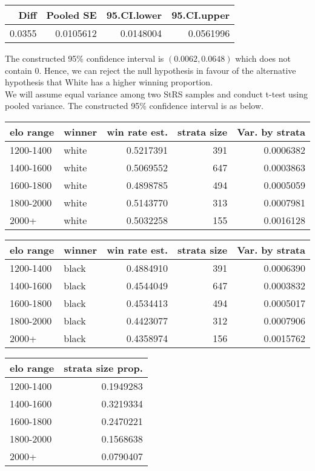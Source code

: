 \documentclass[11pt,]{article}
\begin{document}
\begin{tabular}{r|r|r|r}
\hline
Diff & Pooled SE & 95.CI.lower & 95.CI.upper\\
\hline
0.0355 & 0.0105612 & 0.0148004 & 0.0561996\\
\hline
\end{tabular}

The constructed 95\% confidence interval is \((0.0062, 0.0648)\) which
does not contain 0. Hence, we can reject the null hypothesis in favour
of the alternative hypothesis that White has a higher winning
proportion.\\
\newline We will assume equal variance among two StRS samples and
conduct t-test using pooled variance. The constructed 95\% confidence
interval is as below.

\begin{tabular}{l|l|r|r|r}
\hline
elo range & winner & win rate est. & strata size & Var. by strata\\
\hline
1200-1400 & white & 0.5217391 & 391 & 0.0006382\\
\hline
1400-1600 & white & 0.5069552 & 647 & 0.0003863\\
\hline
1600-1800 & white & 0.4898785 & 494 & 0.0005059\\
\hline
1800-2000 & white & 0.5143770 & 313 & 0.0007981\\
\hline
2000+ & white & 0.5032258 & 155 & 0.0016128\\
\hline
\end{tabular}

\begin{tabular}{l|l|r|r|r}
\hline
elo range & winner & win rate est. & strata size & Var. by strata\\
\hline
1200-1400 & black & 0.4884910 & 391 & 0.0006390\\
\hline
1400-1600 & black & 0.4544049 & 647 & 0.0003832\\
\hline
1600-1800 & black & 0.4534413 & 494 & 0.0005017\\
\hline
1800-2000 & black & 0.4423077 & 312 & 0.0007906\\
\hline
2000+ & black & 0.4358974 & 156 & 0.0015762\\
\hline
\end{tabular}

\begin{tabular}{l|r}
\hline
elo range & strata size prop.\\
\hline
1200-1400 & 0.1949283\\
\hline
1400-1600 & 0.3219334\\
\hline
1600-1800 & 0.2470221\\
\hline
1800-2000 & 0.1568638\\
\hline
2000+ & 0.0790407\\
\hline
\end{tabular}
\end{document}
